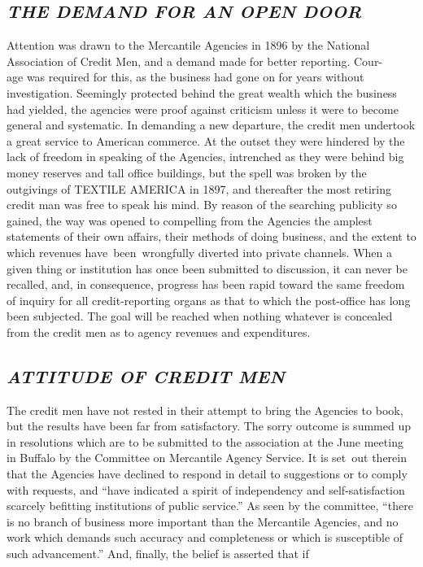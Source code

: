 \documentclass[twoside,symmetric,nobib,justified]{tufte-book}
\begin{document}
\hypertarget{the-demand-for-an-open-door}{%
\subsection{\texorpdfstring{\emph{THE DEMAND FOR AN OPEN
DOOR}}{THE DEMAND FOR AN OPEN DOOR}}\label{the-demand-for-an-open-door}}

Attention was drawn to the Mercantile Agencies in 1896 by the National
Association of Credit Men, and a demand made for better reporting.
Cour-\\\noindent age was required for this, as the business had gone on for years
without investigation. Seemingly protected behind the great wealth which
the business had yielded, the agencies were proof against criticism
unless it were to become general and systematic. In demanding a new
departure, the credit men undertook a great service to American
commerce. At the outset they were hindered by the lack of freedom in
speaking of the Agencies, intrenched as they were behind big money
reserves and tall office buildings, but the spell was broken by the
outgivings of TEXTILE AMERICA in 1897, and thereafter the most retiring
credit man was free to speak his mind. By reason of the searching
publicity so gained, the way was opened to compelling from the Agencies
the amplest statements of their own affairs, their methods of doing
business, and the extent to which revenues have~been~wrongfully diverted
into private channels. When a given thing or institution has once been
submitted to discussion, it can never be recalled, and, in consequence,
progress has been rapid toward the same freedom of inquiry for all
credit-reporting organs as that to which the post-office has long been
subjected. The goal will be reached when nothing whatever is concealed
from the credit men as to agency revenues and expenditures.~

\hypertarget{attitude-of-credit-men}{%
\subsection{\texorpdfstring{\emph{ATTITUDE OF CREDIT
MEN}}{ATTITUDE OF CREDIT MEN}}\label{attitude-of-credit-men}}

The credit men have not rested in their attempt to bring the Agencies to
book, but the results have been far from satisfactory. The sorry outcome
is summed up in resolutions which are to be submitted to the association
at the June meeting in Buffalo by the Committee on Mercantile Agency
Service. It is set~out therein that the Agencies have declined to
respond in detail to suggestions or to comply with requests, and ``have
indicated a spirit of independency and self-satisfaction scarcely
befitting institutions of public service.'' As seen by the committee,
``there is no branch of business more important than the Mercantile
Agencies, and no work which demands such accuracy and completeness or
which is susceptible of such advancement.'' And, finally, the belief is
asserted that if
\end{document}
